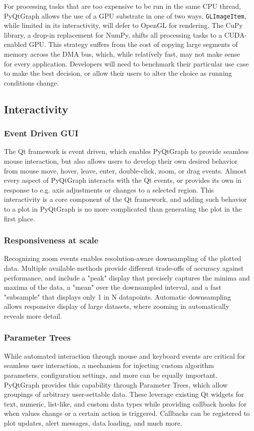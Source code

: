 \documentclass[journal]{vgtc}                %
\begin{document}
For processing tasks that are too expensive to be run in the same CPU thread, PyQtGraph allows the use of a GPU substrate in one of two ways. \texttt{GLImageItem}, while limited in its interactivity, will defer to OpenGL for rendering. The CuPy library, a drop-in replacement for NumPy, shifts all processing tasks to a CUDA-enabled GPU. This strategy suffers from the cost of copying large segments of memory across the DMA bus, which, while relatively fast, may not make sense for every application. Developers will need to benchmark their particular use case to make the best decision, or allow their users to alter the choice as running conditions change.

\subsection{Interactivity}
\subsubsection{Event Driven GUI}
The Qt framework is event driven, which enables PyQtGraph to provide seamless mouse interaction, but also allows users to develop their own desired behavior from mouse move, hover, leave, enter, double-click, zoom, or drag events. Almost every aspect of PyQtGraph interacts with the Qt events, or provides its own in response to e.g. axis adjustments or changes to a selected region. This interactivity is a core component of the Qt framework, and adding such behavior to a plot in PyQtGraph is no more complicated than generating the plot in the first place.

\subsubsection{Responsiveness at scale}

Recognizing zoom events enables resolution-aware downsampling of the plotted data. Multiple available methods provide different trade-offs of accuracy against performance, and include a "peak" display that precisely captures the minima and maxima of the data, a "mean" over the downsampled interval, and a fast "subsample" that displays only 1 in N datapoints. Automatic downsampling allows responsive display of large datasets, where zooming in automatically reveals more detail.

\subsubsection{Parameter Trees}\label{sec:paramtrees}
While automated interaction through mouse and keyboard events are critical for seamless user interaction, a mechanism for injecting custom algorithm parameters, configuration settings, and more can be equally important. PyQtGraph provides this capability through Parameter Trees, which allow groupings of arbitrary user-settable data. These leverage existing Qt widgets for text, numeric, list-like, and custom data types while providing callback hooks for when values change or a certain action is triggered. Callbacks can be registered to plot updates, alert messages, data loading, and much more.
\end{document}
